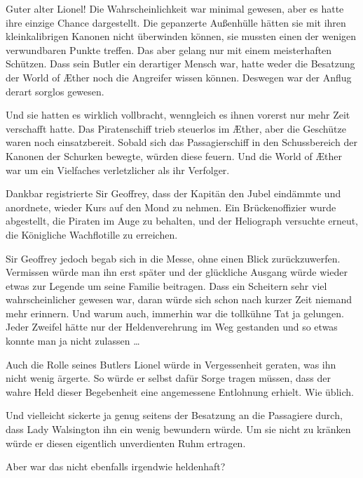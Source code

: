 Guter alter Lionel! Die Wahrscheinlichkeit war minimal gewesen,
aber es hatte ihre einzige Chance dargestellt. Die gepanzerte
Außenhülle hätten sie mit ihren kleinkalibrigen Kanonen nicht
überwinden können, sie mussten einen der wenigen verwundbaren
Punkte treffen. Das aber gelang nur mit einem meisterhaften
Schützen. Dass sein Butler ein derartiger Mensch war, hatte weder
die Besatzung der World of Æther noch die Angreifer wissen können.
Deswegen war der Anflug derart sorglos gewesen.

Und sie hatten es wirklich vollbracht, wenngleich es ihnen vorerst
nur mehr Zeit verschafft hatte. Das Piratenschiff trieb steuerlos
im Æther, aber die Geschütze waren noch einsatzbereit. Sobald sich
das Passagierschiff in den Schussbereich der Kanonen der Schurken
bewegte, würden diese feuern. Und die World of Æther war um ein
Vielfaches verletzlicher als ihr Verfolger.

\bigpar

Dankbar registrierte Sir Geoffrey, dass der Kapitän den Jubel
eindämmte und anordnete, wieder Kurs auf den Mond zu nehmen. Ein
Brückenoffizier wurde abgestellt, die Piraten im Auge zu behalten,
und der Heliograph versuchte erneut, die Königliche Wachflotille zu
erreichen.

\bigpar

Sir Geoffrey jedoch begab sich in die Messe, ohne einen Blick
zurückzuwerfen. Vermissen würde man ihn erst später und der
glückliche Ausgang würde wieder etwas zur Legende um seine Familie
beitragen. Dass ein Scheitern sehr viel wahrscheinlicher gewesen
war, daran würde sich schon nach kurzer Zeit niemand mehr erinnern.
Und warum auch, immerhin war die tollkühne Tat ja gelungen. Jeder
Zweifel hätte nur der Heldenverehrung im Weg gestanden und so etwas
konnte man ja nicht zulassen …

Auch die Rolle seines Butlers Lionel würde in Vergessenheit
geraten, was ihn nicht wenig ärgerte. So würde er selbst dafür
Sorge tragen müssen, dass der wahre Held dieser Begebenheit eine
angemessene Entlohnung erhielt. Wie üblich.

Und vielleicht sickerte ja genug seitens der Besatzung an die
Passagiere durch, dass Lady Walsington ihn ein wenig bewundern
würde. Um sie nicht zu kränken würde er diesen eigentlich
unverdienten Ruhm ertragen.

\bigpar

Aber war das nicht ebenfalls irgendwie heldenhaft?


